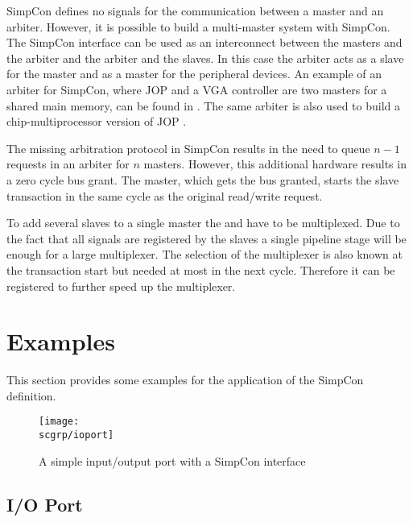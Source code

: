 SimpCon defines no signals for the communication between a master and
an arbiter. However, it is possible to build a multi-master system
with SimpCon. The SimpCon interface can be used as an interconnect
between the masters and the arbiter and the arbiter and the slaves.
In this case the arbiter acts as a slave for the master and as a
master for the peripheral devices. An example of an arbiter for
SimpCon, where JOP and a VGA controller are two masters for a shared
main memory, can be found in \cite{jop:dma}. The same arbiter is also
used to build a chip-multiprocessor version of JOP
\cite{jop:cmp:eval}.

The missing arbitration protocol in SimpCon results in the need to
queue $n-1$ requests in an arbiter for $n$ masters. However, this
additional hardware results in a zero cycle bus grant. The master,
which gets the bus granted, starts the slave transaction in the same
cycle as the original read/write request.


To add several slaves to a single master the  and
 have to be multiplexed. Due to the fact that all
 signals are registered by the slaves a single
pipeline stage will be enough for a large multiplexer. The selection
of the multiplexer is also known at the transaction start but needed
at most in the next cycle. Therefore it can be registered to further
speed up the multiplexer.


\section{Examples}

This section provides some examples for the application of the
SimpCon definition.

\begin{figure}
    \centering
    \texttt{[image: \\scgrp/ioport]}
    \caption{A simple input/output port with a SimpCon interface}
    \label{fig:sc:ioport}
\end{figure}

\subsection{I/O Port}

